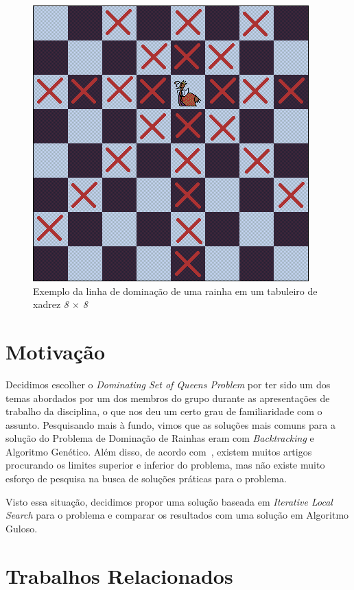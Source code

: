 \documentclass[
	article,			%
	11pt,				%
	oneside,			%
	a4paper,			%
	english,			%
	brazil,				%
	sumario=tradicional
	]{abntex2}
\begin{document}
  \begin{figure}
    \centering
    \includegraphics[width=0.60\linewidth]{dom1rainha8x8.png}
    \caption{Exemplo da linha de dominação de uma rainha em um tabuleiro de xadrez \textit{8 $\times$ 8}}
    \label{fig:1rainha}
  \end{figure}

\section{Motivação}

Decidimos escolher o \textit{Dominating Set of Queens Problem} por ter sido um dos temas abordados por um dos membros do grupo durante as apresentações de trabalho da disciplina, o que nos deu um certo grau de familiaridade com o assunto. Pesquisando mais à fundo, vimos que as soluções mais comuns para a solução do Problema de Dominação de Rainhas eram com \textit{Backtracking} e Algoritmo Genético. Além disso, de acordo com~\cite{alharbi2017genetic}, existem muitos artigos procurando os limites superior e inferior do problema, mas não existe muito esforço de pesquisa
na busca de soluções práticas para o problema.

Visto essa situação, decidimos propor uma solução baseada em \textit{Iterative Local Search} para o problema e comparar os resultados com uma solução em Algoritmo Guloso.

\section{Trabalhos Relacionados}
\end{document}
